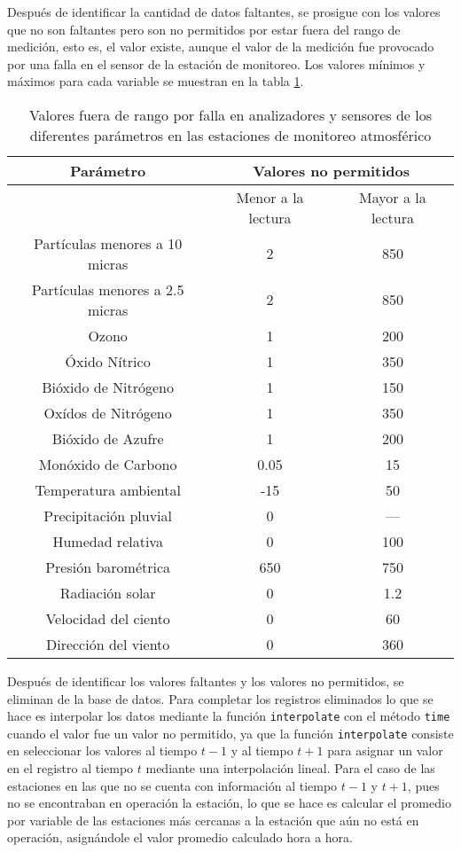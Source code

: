 Después de identificar la cantidad de datos faltantes, se prosigue con los valores que no son faltantes pero son no permitidos por estar fuera del rango de medición, esto es, el valor existe, aunque el valor de la medición fue provocado por una falla en el sensor de la estación de monitoreo. Los valores mínimos y máximos para cada variable se muestran en la tabla \ref{permitidos}. 

\begin{table}[H]
\centering
\caption{Valores fuera de rango por falla en analizadores y sensores de los diferentes parámetros en las estaciones de monitoreo atmosférico}
\begin{adjustbox}{max width=0.9\textwidth}
\begin{tabular}{|c|c|c|}
\hline
Parámetro &\multicolumn{2}{|c|}{Valores no permitidos}  \\ \hline
 &Menor a la lectura &Mayor a la lectura    \\ \hline
Partículas menores a 10 micras &2 &850\\
Partículas menores a 2.5 micras &2 &850\\
Ozono &1 &200\\   
Óxido Nítrico &1 &350\\ 
Bióxido de Nitrógeno &1 &150\\
Oxídos de Nitrógeno &1 &350\\
Bióxido de Azufre &1 &200\\
Monóxido de Carbono &0.05 &15\\
Temperatura ambiental &-15 &50\\
Precipitación pluvial &0 &---\\
Humedad relativa &0 &100 \\
Presión barométrica &650 &750 \\
Radiación solar &0 &1.2 \\
Velocidad del ciento &0 &60 \\
Dirección del viento &0 &360\\ \hline
\end{tabular}
\end{adjustbox}
\label{permitidos}
\end{table}

Después de identificar los valores faltantes y los valores no permitidos, se eliminan de la base de datos. Para completar los registros eliminados lo que se hace es interpolar los datos mediante la función \texttt{interpolate} con el método \texttt{time} cuando el valor fue un valor no permitido,  ya que la función \texttt{interpolate} consiste en seleccionar los valores al tiempo $t-1$ y al tiempo $t+1$ para asignar un valor en el registro al tiempo $t$ mediante una interpolación lineal. Para el caso de las estaciones en las que no se cuenta con información al tiempo $t-1$ y $t+1$, pues no se encontraban en operación la estación, lo que se hace es calcular el promedio por variable de las estaciones más cercanas a la estación que aún no está en operación, asignándole el valor promedio calculado hora a hora.


